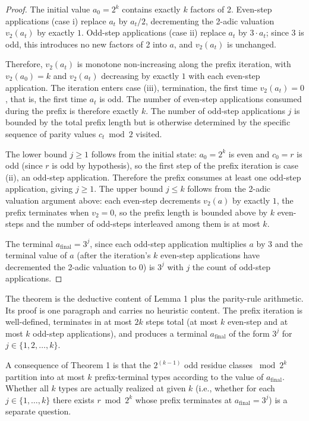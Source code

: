 \documentclass{article}
\theoremstyle{plain}
\begin{document}
\begin{proof}
    The initial value $a_0 = 2^k$ contains exactly $k$ factors of 2. Even-step applications (case i) replace $a_t$ by $a_t/2$, decrementing the 2-adic valuation $v_2(a_t)$ by exactly $1$. Odd-step applications (case ii) replace $a_t$ by $3 \cdot a_t$; since $3$ is odd, this introduces no new factors of 2 into $a$, and $v_2(a_t)$ is unchanged.

    Therefore, $v_2(a_t)$ is monotone non-increasing along the prefix iteration, with $v_2(a_0) = k$ and $v_2(a_t)$ decreasing by exactly $1$ with each even-step application. The iteration enters case (iii), termination, the first time $v_2(a_t) = 0$, that is, the first time $a_t$ is odd. The number of even-step applications consumed during the prefix is therefore exactly $k$. The number of odd-step applications $j$ is bounded by the total prefix length but is otherwise determined by the specific sequence of parity values $c_t \bmod 2$ visited.

    The lower bound $j \geq 1$ follows from the initial state: $a_0 = 2^k$ is even and $c_0 = r$ is odd (since $r$ is odd by hypothesis), so the first step of the prefix iteration is case (ii), an odd-step application. Therefore the prefix consumes at least one odd-step application, giving $j \geq 1$. The upper bound $j \leq k$ follows from the 2-adic valuation argument above: each even-step decrements $v_2(a)$ by exactly $1$, the prefix terminates when $v_2 = 0$, so the prefix length is bounded above by $k$ even-steps and the number of odd-steps interleaved among them is at most $k$.
    
    The terminal $a_{\text{final}} = 3^j$, since each odd-step application multiplies $a$ by $3$ and the terminal value of $a$ (after the iteration's $k$ even-step applications have decremented the 2-adic valuation to $0$) is $3^j$ with $j$ the count of odd-step applications.
\end{proof}

The theorem is the deductive content of Lemma 1 plus the parity-rule arithmetic. Its proof is one paragraph and carries no heuristic content. The prefix iteration is well-defined, terminates in at most $2k$ steps total (at most $k$ even-step and at most $k$ odd-step applications), and produces a terminal $a_{\text{final}}$ of the form $3^j$ for $j \in \{1, 2, \ldots, k\}$.

A consequence of Theorem 1 is that the $2^{(k-1)}$ odd residue classes $\bmod 2^k$ partition into at most $k$ prefix-terminal types according to the value of $a_{\text{final}}$. Whether all $k$ types are actually realized at given $k$ (i.e., whether for each $j \in \{1, \ldots, k\}$ there exists $r \bmod 2^k$ whose prefix terminates at $a_{\text{final}} = 3^j$) is a separate question.
\end{document}
